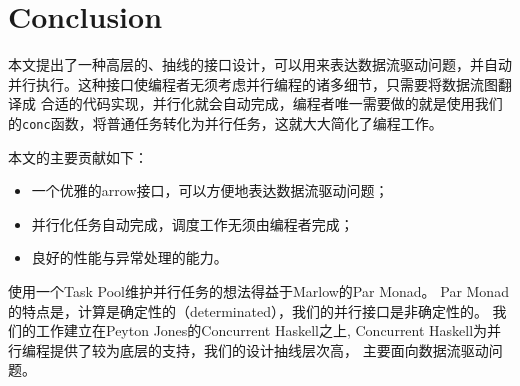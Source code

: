 \documentclass[conference]{IEEEtran}
\begin{document}

\section{Conclusion}
本文提出了一种高层的、抽线的接口设计，可以用来表达数据流驱动问题，并自动
并行执行。这种接口使编程者无须考虑并行编程的诸多细节，只需要将数据流图翻译成
合适的代码实现，并行化就会自动完成，编程者唯一需要做的就是使用我们
的\texttt{conc}函数，将普通任务转化为并行任务，这就大大简化了编程工作。

本文的主要贡献如下：
\begin{itemize}
  \item 一个优雅的arrow接口，可以方便地表达数据流驱动问题；
  \item 并行化任务自动完成，调度工作无须由编程者完成；
  \item 良好的性能与异常处理的能力。
\end{itemize}

使用一个Task Pool维护并行任务的想法得益于Marlow的Par Monad。\cite{Marlow2011a}
Par Monad的特点是，计算是确定性的（determinated），我们的并行接口是非确定性的。
我们的工作建立在Peyton Jones的Concurrent Haskell之上\cite{Jones1996},
Concurrent Haskell为并行编程提供了较为底层的支持，我们的设计抽线层次高，
主要面向数据流驱动问题。
\end{document}

